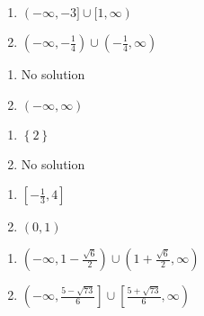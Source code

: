 \documentclass{ximera}
\begin{document}
\begin{multicols}{2}
\begin{enumerate}
\setcounter{enumi}{\value{HW}}

\item $(-\infty, -3] \cup [1, \infty)$

\item  $\left(-\infty, -\frac{1}{4}\right) \cup \left(-\frac{1}{4}, \infty \right)$

\setcounter{HW}{\value{enumi}}
\end{enumerate}
\end{multicols}

\begin{multicols}{2}
\begin{enumerate}
\setcounter{enumi}{\value{HW}}

\item  No solution
\item  $(-\infty, \infty)$


\setcounter{HW}{\value{enumi}}
\end{enumerate}
\end{multicols}

\begin{multicols}{2}
\begin{enumerate}
\setcounter{enumi}{\value{HW}}

\item  $\left\{2 \right\}$
\item No solution


\setcounter{HW}{\value{enumi}}
\end{enumerate}
\end{multicols}

\begin{multicols}{2}
\begin{enumerate}
\setcounter{enumi}{\value{HW}}

\item $\left[-\frac{1}{3}, 4 \right]$
\item $(0, 1)$

\setcounter{HW}{\value{enumi}}
\end{enumerate}
\end{multicols}

\begin{multicols}{2}
\begin{enumerate}
\setcounter{enumi}{\value{HW}}


\item  $\left(-\infty, 1-\frac{\sqrt{6}}{2} \right) \cup \left(1+\frac{\sqrt{6}}{2}, \infty \right)$

\item  $\left(-\infty, \frac{5 - \sqrt{73}}{6} \right] \cup \left[\frac{5 + \sqrt{73}}{6}, \infty \right)$


\setcounter{HW}{\value{enumi}}
\end{enumerate}
\end{multicols}
\end{document}
